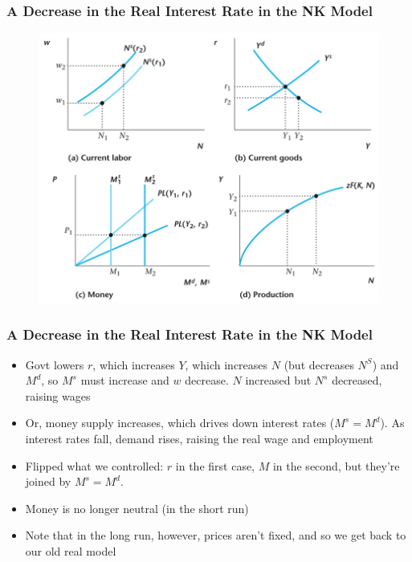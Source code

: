 \documentclass{beamer}
\begin{document}
\begin{frame}
\frametitle[alignment=center]{A Decrease in the Real Interest Rate in the NK Model}
\begin{figure}
\centering
\includegraphics[scale=0.6]{Figures/W_Fig_14pt2.png}
\end{figure}
\end{frame}

\begin{frame}
\frametitle[alignment=center]{A Decrease in the Real Interest Rate in the NK Model}
\begin{itemize}
\item Govt lowers $r$, which increases $Y$, which increases $N$ (but decreases $N^S$) and $M^d$, so $M^s$ must increase and $w$ decrease.  $N$ increased but $N^s$ decreased, raising wages
\bigskip
\item Or, money supply increases, which drives down interest rates ($M^s=M^d$).  As interest rates fall, demand rises, raising the real wage and employment
\bigskip
\item Flipped what we controlled: $r$ in the first case, $M$ in the second, but they're joined by $M^s=M^d$. 
\bigskip 
\item Money is no longer neutral (in the short run)
\bigskip
\item Note that in the long run, however, prices aren't fixed, and so we get back to our old real model
\end{itemize}
\end{frame}
\end{document}
